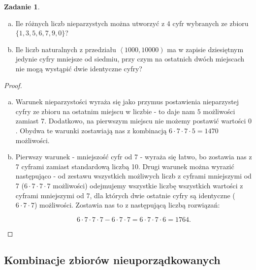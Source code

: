 \documentclass[11pt]{article}
\theoremstyle{definition}
\newtheorem{zadanie}{Zadanie}
\numberwithin{zadanie}{subsection}
\begin{document}
\begin{zadanie}
    \begin{enumerate}[a)]
        \item Ile różnych liczb nieparzystych można utworzyć z 4 cyfr wybranych ze zbioru $\{1, 3, 5, 6, 7, 9, 0\}$?
        \item Ile liczb naturalnych z przedziału $\left<1000, 10 000\right)$ ma w zapisie dziesiętnym jedynie cyfry mniejsze od siedmiu, przy czym na ostatnich dwóch miejscach nie mogą wystąpić dwie identyczne cyfry?
    \end{enumerate}
\end{zadanie}
\begin{proof}
    \begin{enumerate}[a)]
        \item Warunek nieparzystości wyraża się jako przymus postawienia nieparzystej cyfry ze zbioru na ostatnim miejscu w liczbie - to daje nam $5$ możliwości zamiast $7$. Dodatkowo, na pierwszym miejscu nie możemy postawić wartości $0$. Obydwa te warunki zostawiają nas z kombinacją $6\cdot7\cdot7\cdot5 = 1470$ możliwości.

        \item Pierwszy warunek - mniejszość cyfr od 7 - wyraża się łatwo, bo zostawia nas z 7 cyframi zamiast standardową liczbą 10. Drugi warunek można wyrazić następująco - od zestawu wszystkich możliwych liczb z cyframi mniejszymi od 7 ($6\cdot7\cdot7\cdot7$ możliwości) odejmujemy wszystkie liczbę wszystkich wartości z cyframi mniejszymi od 7, dla których dwie ostatnie cyfry są identyczne ($6\cdot7\cdot7$) możliwości. Zostawia nas to z następującą liczbą rozwiązań:

              $$6\cdot7\cdot7\cdot7 - 6\cdot7\cdot 7 = 6\cdot7\cdot7\cdot6 = 1764.$$
    \end{enumerate}
\end{proof}

\subsection{Kombinacje zbiorów nieuporządkowanych}
\end{document}
